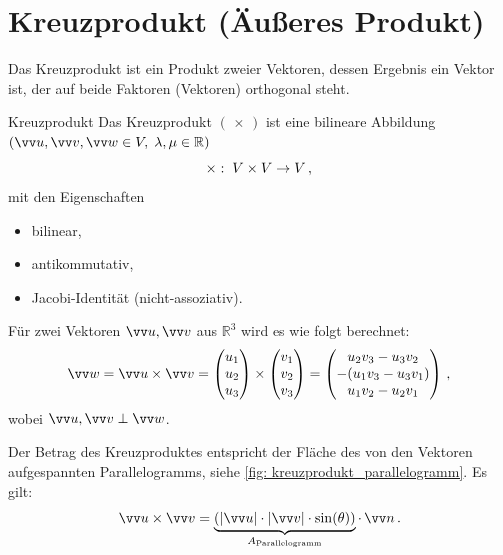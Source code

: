 \section{Kreuzprodukt (Äußeres Produkt)}\label{sec: Kreuzprodukt_AeusseresProdukt}
Das Kreuzprodukt ist ein Produkt zweier Vektoren, dessen Ergebnis ein Vektor ist, der auf beide Faktoren (Vektoren) orthogonal steht. 
\begin{rememberbox}[]{Kreuzprodukt}
    Das Kreuzprodukt $(\,\times\,)$ ist eine bilineare Abbildung $(\ivec{u}, \ivec{v}, \ivec{w} \in V,\; \lambda,\mu \in \Real)$
    \begin{equation}
        \times :\; V \times V \to V\,{,}\,
    \end{equation}
    mit den Eigenschaften 
    \begin{itemize}[nosep]
        \item bilinear,
        \item antikommutativ, 
        \item Jacobi-Identität (nicht-assoziativ).
    \end{itemize}
    \vspace{0.2cm}
    Für zwei Vektoren $\ivec{u}, \ivec{v}$ aus $\mathbb{R}^3$ wird es wie folgt berechnet:
    \begin{equation}
        \ivec{w} = \ivec{u} \times \ivec{v} = \begin{pmatrix} u_1 \\ u_2 \\ u_3 \end{pmatrix} \times \begin{pmatrix} v_1 \\ v_2 \\ v_3 \end{pmatrix} = \begin{pmatrix} u_2v_3 - u_3v_2 \\ -(u_1v_3 - u_3v_1) \\ u_1v_2 - u_2v_1 \end{pmatrix}\mComma
    \end{equation}
    wobei $\ivec{u}, \ivec{v} \perp \ivec{w}$.
\end{rememberbox}
Der Betrag des Kreuzproduktes entspricht der Fläche des von den Vektoren aufgespannten Parallelogramms, siehe \cref{fig: kreuzprodukt_parallelogramm}. Es gilt:
\begin{equation} 
    \ivec{u} \times \ivec{v} = \underbrace{(|\ivec{u}| \cdot |\ivec{v}| \cdot \sin(\theta))}_{A_\mathrm{Parallelogramm}} \cdot\,\ivec{n} \mDot
\end{equation}
